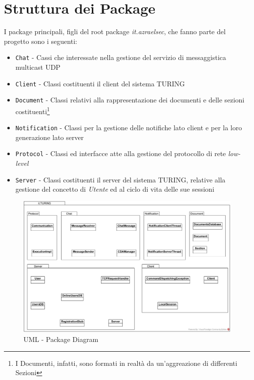 \section{Struttura dei Package}
I package principali, figli del root package \textit{it.azraelsec}, che fanno parte del progetto sono i seguenti:
\begin{itemize}
	\item \texttt{Chat} - Cassi che interessate nella gestione del servizio di messaggistica multicast UDP
	\item \texttt{Client} - Classi costituenti il client del sistema TURING
	\item \texttt{Document} - Classi relativi alla rappresentazione dei documenti e delle sezioni costituenti\footnote{I Documenti, infatti, sono formati in realtà da un'aggreazione di differenti Sezioni}
	\item \texttt{Notification} - Classi per la gestione delle notifiche lato client e per la loro generazione lato server
	\item \texttt{Protocol} - Classi ed interfacce atte alla gestione del protocollo di rete \textit{low-level}
	\item \texttt{Server} - Classi costituenti il server del sistema TURING, relative alla gestione del concetto di \textit{Utente} ed al ciclo di vita delle sue sessioni
\end{itemize}
\begin{figure}[h]
	\caption{UML - Package Diagram}
	\centering
	\includegraphics[width=1\linewidth]{assets/package_diagram}
\end{figure}

\pagebreak
